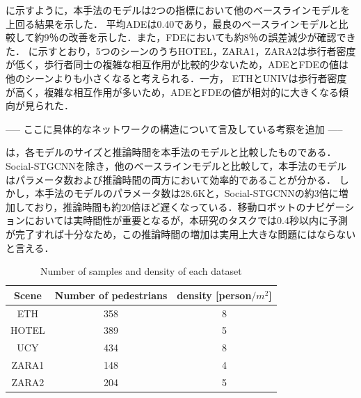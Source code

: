 \protect{}

に示すように，本手法のモデルは2つの指標において他のベースラインモデルを上回る結果を示した．
平均ADEは0.40であり，最良のベースラインモデルと比較して約9％の改善を示した．また，FDEにおいても約8％の誤差減少が確認できた．
に示すとおり，5つのシーンのうちHOTEL，ZARA1，ZARA2は歩行者密度が低く，歩行者同士の複雑な相互作用が比較的少ないため，ADEとFDEの値は他のシーンよりも小さくなると考えられる．一方，
ETHとUNIVは歩行者密度が高く，複雑な相互作用が多いため，ADEとFDEの値が相対的に大きくなる傾向が見られた．

\vspace{30pt}
\begin{center}
  -----
  ここに具体的なネットワークの構造について言及している考察を追加
  -----
\end{center}

\newpage

は，各モデルのサイズと推論時間を本手法のモデルと比較したものである．
Social-STGCNN\cite{s-stgcnn}を除き，他のベースラインモデルと比較して，本手法のモデルはパラメータ数および推論時間の両方において効率的であることが分かる．
しかし，本手法のモデルのパラメータ数は28.6Kと，Social-STGCNNの約3倍に増加しており，推論時間も約20倍ほど遅くなっている．移動ロボットのナビゲーションにおいては実時間性が重要となるが，本研究のタスクでは0.4秒以内に予測が完了すれば十分なため，この推論時間の増加は実用上大きな問題にはならないと言える．

\begin{table}[hbtp]
  \begin{center}
  \caption{Number of samples and density of each dataset\protect\footnotemark[7]}
  \label{tab:density}
  \begin{tabular}{c||c|c}
  Scene & Number of pedestrians & density [person$/ m^2$] \\ 
  \hline \hline
  ETH      & 358       & 8                      \\
  \hline
  HOTEL    & 389       & 5                      \\
  \hline
  UCY      & 434       & 8                      \\
  \hline
  ZARA1   & 148       & 4                      \\
  \hline
  ZARA2   & 204       & 5                      \\
  \hline
  \end{tabular}
  \end{center}
\end{table}

